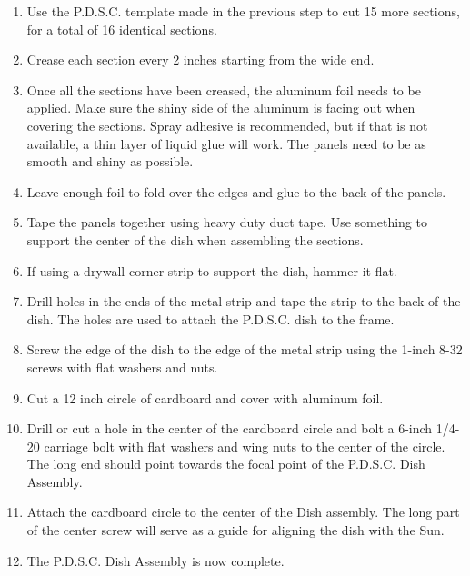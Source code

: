\documentclass[titlepage]{article}
\begin{document}
            \begin{enumerate}
                \item Use the P.D.S.C. template made in the previous step to cut 15 more sections, for a total of 16 identical sections.
                \item Crease each section every 2 inches starting from the wide end.
                \item Once all the sections have been creased, the aluminum foil needs to be applied.  Make sure the shiny side of the aluminum is facing out when covering the sections. Spray adhesive is recommended, but if that is not available, a thin layer of liquid glue will work.  The panels need to be as smooth and shiny as possible.
                \item Leave enough foil to fold over the edges and glue to the back of the panels.
                \item Tape the panels together using heavy duty duct tape.  Use something to support the center of the dish when assembling the sections.
                \item If using a drywall corner strip to support the dish, hammer it flat.
                \item Drill holes in the ends of the metal strip and tape the strip to the back of the dish.  The holes are used to attach the P.D.S.C. dish to the frame.
                \item Screw the edge of the dish to the edge of the metal strip using the 1-inch 8-32 screws with flat washers and nuts.
                \item Cut a 12 inch circle of cardboard and cover with aluminum foil.
                \item Drill or cut a hole in the center of the cardboard circle and bolt a 6-inch 1/4-20 carriage bolt with flat washers and wing nuts to the center of the circle.  The long end should point towards the focal point of the P.D.S.C. Dish Assembly.
                \item Attach the cardboard circle to the center of the Dish assembly.  The long part of the center screw will serve as a guide for aligning the dish with the Sun.
                \item The P.D.S.C. Dish Assembly is now complete. 
                
            \end{enumerate}
    
\end{document}
